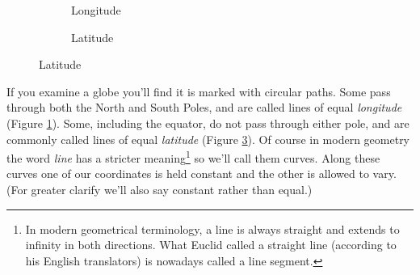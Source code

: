 \begin{figure}[h]
\begin{subfigure}{0.5\textwidth}
\begin{tikzpicture}[tdplot_main_coords, scale = 2]
        \end{tikzpicture}
        \caption{Longitude} \label{fig:globe-longitude}
    \end{subfigure}
    \begin{subfigure}{0.5\textwidth}
        \centering
    \caption{Latitude} \label{fig:globe-latitude}
    \end{subfigure}
\end{figure}

If you examine a globe you'll find it is marked with circular paths. Some pass through both the North and South Poles, and are called lines of equal \textit{longitude} (Figure \ref{fig:globe-longitude}). Some, including the equator, do not pass through either pole, and are commonly called lines of equal \textit{latitude} (Figure \ref{fig:globe-latitude}). Of course in modern geometry the word \textit{line} has a stricter meaning\footnote{In modern geometrical terminology, a line is always straight and extends to infinity in both directions. What Euclid called a straight line (according to his English translators) is nowadays called a line segment.} so we'll call them curves. Along these curves one of our coordinates is held constant and the other is allowed to vary. (For greater clarify we'll also say constant rather than equal.)

